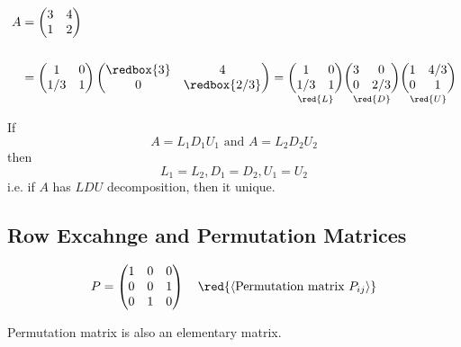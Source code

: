 \begin{eg}
\begin{align*}
    A &= \begin{pmatrix}
        3 & 4 \\
        1 & 2
    \end{pmatrix}\\ \\ &= \begin{pmatrix}
        1 & 0 \\
        1/3 & 1
    \end{pmatrix} \begin{pmatrix}
        \redbox{3} & 4 \\
        0 & \redbox{2/3}
    \end{pmatrix} = \underset{\red{L}}{\begin{pmatrix}
        1 & 0 \\
        1/3 & 1
    \end{pmatrix}} \underset{\red{D}}{\begin{pmatrix}
        3 & 0 \\
        0 & 2/3 
    \end{pmatrix}} \underset{\red{U}}{\begin{pmatrix}
        1 & 4/3 \\
        0 & 1
    \end{pmatrix}}
\end{align*}

\end{eg}

\begin{theorem}
    If \[ A = L_1D_1U_1 \text{ and } A = L_2D_2U_2\]
    then \[L_1 = L_2, D_1 = D_2, U_1 = U_2\]
    i.e. if $A$ has $LDU$ decomposition, then it  unique.
\end{theorem}

\newpage

\subsection{Row Excahnge and Permutation Matrices}
\[
P = \begin{pmatrix}
    1 & 0 & 0 \\
    0 & 0 & 1 \\
    0 & 1 & 0 
\end{pmatrix}
\quad \red{\langle \text{Permutation matrix } P_{ij} \rangle}
\]

\begin{note}
    Permutation matrix is also an elementary matrix.
\end{note}

